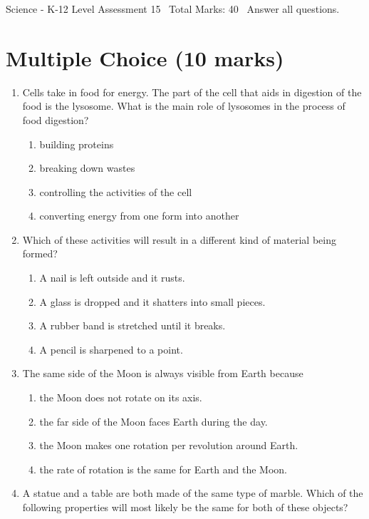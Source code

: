 \documentclass[12pt]{article}
\begin{document}
\begin{center}
Science - K-12 Level Assessment 15 \
Total Marks: 40 \
Answer all questions.
\end{center}

\section*{Multiple Choice (10 marks)}
\begin{enumerate}[label=\arabic*.]
\item Cells take in food for energy. The part of the cell that aids in digestion of the food is the lysosome. What is the main role of lysosomes in the process of food digestion?
\begin{enumerate}[label=(\alph*)]
    \item building proteins
    \item breaking down wastes
    \item controlling the activities of the cell
    \item converting energy from one form into another
\end{enumerate}
\item Which of these activities will result in a different kind of material being formed?
\begin{enumerate}[label=(\alph*)]
    \item A nail is left outside and it rusts.
    \item A glass is dropped and it shatters into small pieces.
    \item A rubber band is stretched until it breaks.
    \item A pencil is sharpened to a point.
\end{enumerate}
\item The same side of the Moon is always visible from Earth because
\begin{enumerate}[label=(\alph*)]
    \item the Moon does not rotate on its axis.
    \item the far side of the Moon faces Earth during the day.
    \item the Moon makes one rotation per revolution around Earth.
    \item the rate of rotation is the same for Earth and the Moon.
\end{enumerate}
\item A statue and a table are both made of the same type of marble. Which of the following properties will most likely be the same for both of these objects?

\end{enumerate}
\end{document}
